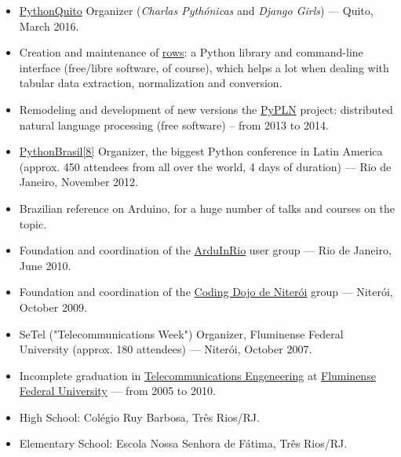 \documentclass[a4paper,11pt]{article}
\begin{document}
	\begin{itemize}
		\item \href{http://pythonquito.tk}{PythonQuito} Organizer
			(\textit{Charlas Pythónicas} and \textit{Django Girls}) --- Quito,
			March 2016.
		\item Creation and maintenance of
			\href{https://github.com/turicas/rows}{rows}: a Python library and
			command-line interface (free/libre software, of course), which
			helps a lot when dealing with tabular data extraction,
			normalization and conversion.
		\item Remodeling and development of new versions the
			\href{http://pypln.org/}{PyPLN} project: distributed natural
			language processing (free software) -- from 2013 to 2014.
		\item \href{http://2012.pythonbrasil.org.br/}{PythonBrasil[8]}
			Organizer, the biggest Python conference in Latin America (approx.
			450 attendees from all over the world, 4 days of duration) --- Rio
			de Janeiro, November 2012.
		\item Brazilian reference on Arduino, for a huge number of talks and
			courses on the topic.
		\item Foundation and coordination of the
			\href{https://groups.google.com/forum/#!forum/arduinrio}{ArduInRio}
			user group --- Rio de Janeiro, June 2010.
		\item Foundation and coordination of the
			\href{http://dojorio.org}{Coding Dojo de Niterói} group ---
			Niterói, October 2009.
		\item SeTel ("Telecommunications Week") Organizer, Fluminense Federal
			University (approx. 180 attendees) --- Niterói, October 2007.
	 \end{itemize}


	\begin{itemize}
		\item Incomplete graduation in
			\href{http://telecom.uff.br/}{Telecommunications Engeneering} at
			\href{http://www.uff.br/}{Fluminense Federal University} ---
			from 2005 to 2010.
		\item High School: Colégio Ruy Barbosa, Três Rios/RJ.
		\item Elementary School: Escola Nossa Senhora de Fátima, Três Rios/RJ.
	 \end{itemize}
\end{document}
